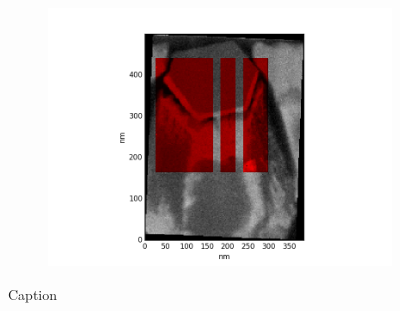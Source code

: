 \begin{figure}
\begin{subfigure}{0.25\textwidth}
		\caption{}
		\label{fig:edxspedrot}
	\end{subfigure}%
	\begin{subfigure}{0.25\textwidth}
		\includegraphics[width=\textwidth]{fig/other/edxinsped/show/onlyScale}
		\caption{}
		\label{fig:edxspedscale}
	\end{subfigure}%
	\caption{
		\label{fig:edxsped}%
		Caption}
\end{figure}




